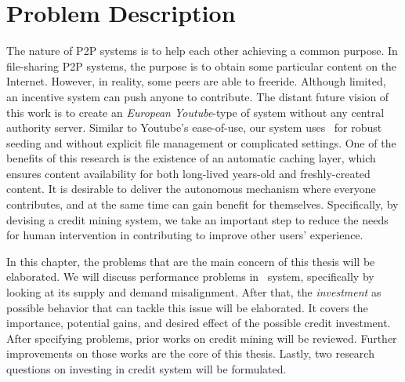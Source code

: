 \chapter{Problem Description}
\label{chp:relwork}
The nature of P2P systems is to help each other achieving a common purpose. In file-sharing P2P systems, the purpose is to obtain some particular content on the Internet. However, in reality, some peers are able to freeride. Although limited, an incentive system can push anyone to contribute. The distant future vision of this work is to create an \textit{European Youtube}-type of system without any central authority server. Similar to Youtube's ease-of-use, our system uses \bt~for robust seeding and without explicit file management or complicated settings. One of the benefits of this research is the existence of an automatic caching layer, which ensures content availability for both long-lived years-old and freshly-created content. It is desirable to deliver the autonomous mechanism where everyone contributes, and at the same time can gain benefit for themselves. Specifically, by devising a credit mining system, we take an important step to reduce the needs for human intervention in contributing to improve other users' experience.

In this chapter, the problems that are the main concern of this thesis will be elaborated. We will discuss performance problems in \bt~system, specifically by looking at its supply and demand misalignment. After that, the \textit{investment} as possible behavior that can tackle this issue will be elaborated. It covers the importance, potential gains, and desired effect of the possible credit investment. After specifying problems, prior works on credit mining will be reviewed. Further improvements on those works are the core of this thesis. Lastly, two research questions on investing in credit system will be formulated.
 

